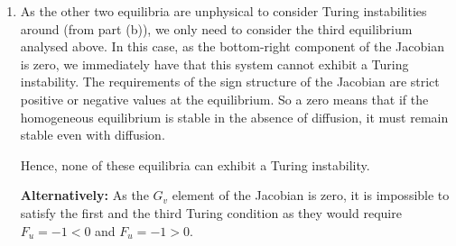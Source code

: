 \documentclass[a4paper,12pt]{article}
\begin{document}
\begin{enumerate}
{\begin{enumerate}[label=(\alph*)]
            To satisfy the condition $\tr(\m{J})<0$, we must have
            \[
                1
                <2u_0+\frac{2av_0u_0}{(1+bu_0^2)^2}
                =2u_0+2\frac{1-u_0}{1+bu_0^2},
            \]
            which must be satisfied alongside $a>c(b+1)$ (the
            permissibility requirement).



            \item
            As the other two equilibria are unphysical to consider Turing
            instabilities around (from part (b)), we only need to consider
            the third equilibrium analysed above. In this case, as the
            bottom-right component of the Jacobian is zero, we immediately
            have that this system cannot exhibit a Turing instability.
            The requirements of the sign structure of the Jacobian are
            strict positive or negative values at the equilibrium. So a
            zero means that if the homogeneous equilibrium is stable in
            the absence of diffusion, it must remain stable even with
            diffusion.

            Hence, none of these equilibria can exhibit a Turing instability.

            \textbf{Alternatively:} As the $G_v$ element of the Jacobian
            is zero, it is impossible to satisfy the first and the third
            Turing condition as they would require $F_u=-1<0$ and
            $F_u=-1>0$.


        \end{enumerate}
    }

\end{enumerate}
\end{document}
